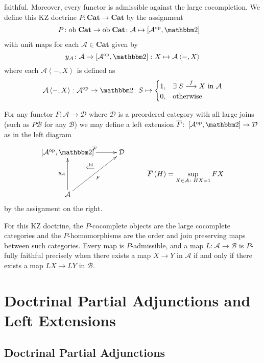 \documentclass[a4paper,oneside,english]{amsart}
\numberwithin{equation}{section}
\numberwithin{figure}{section}
\theoremstyle{plain}
\theoremstyle{definition}
\theoremstyle{remark}
\theoremstyle{definition}
\theoremstyle{plain}
\theoremstyle{plain}
\theoremstyle{plain}
\begin{document}
faithful. Moreover, every functor is admissible against the large
cocompletion. We define this KZ doctrine $P\colon\mathbf{Cat}\to\mathbf{Cat}$
by the assignment 
\[
\begin{aligned}P\colon\textnormal{ob}\;\mathbf{Cat}\to\textnormal{ob}\;\mathbf{Cat}\colon & \mathcal{A}\mapsto\left[\mathcal{A}^{\textnormal{op}},\mathbbm2\right]\end{aligned}
\]
with unit maps for each $\mathcal{A}\in\mathbf{Cat}$ given by
\[
y_{\mathcal{A}}\colon\mathcal{A}\to\left[\mathcal{A}^{\textnormal{op}},\mathbbm2\right]\colon X\mapsto\mathcal{A}\left\langle -,X\right\rangle 
\]
where each $\mathcal{A}\left\langle -,X\right\rangle $ is defined
as 
\[
\mathcal{A}\left\langle -,X\right\rangle \colon\mathcal{A}^{\textnormal{op}}\to\mathbbm2\colon S\mapsto\begin{cases}
1, & \exists\;S\overset{f}{\longrightarrow}X\textnormal{ in }\mathcal{A}\\
0, & \textnormal{otherwise}
\end{cases}
\]

For any functor $F\colon\mathcal{A}\to\mathcal{D}$ where $\mathcal{D}$
is a preordered category with all large joins (such as $P\mathcal{B}$
for any $\mathcal{B}$) we may define a left extension $\overline{F}\colon\left[\mathcal{A}^{\textnormal{op}},\mathbbm2\right]\to\mathcal{D}$
as in the left diagram
\[
\xymatrix@=1em{\left[\mathcal{A}^{\textnormal{op}},\mathbbm2\right]\ar[rr]^{\overline{F}} &  & \mathcal{D}\\
 & \;\ar@{}[ul]|-{\overset{\textnormal{id}}{\Longleftarrow\;}} &  &  & {\displaystyle \overline{F}\left(H\right)=\sup_{X\in\mathcal{A}\colon HX=1}FX}\\
\mathcal{A}\ar[uu]^{y_{\mathcal{A}}}\ar[rruu]_{F}
}
\]
by the assignment on the right.

For this KZ doctrine, the $P$-cocomplete objects are the large cocomplete
categories and the $P$-homomorphisms are the order and join preserving
maps between such categories. Every map is $P$-admissible, and a
map $L\colon\mathcal{A}\to\mathcal{B}$ is $P$-fully faithful precisely
when there exists a map $X\to Y$ in $\mathcal{A}$ if and only if
there exists a map $LX\to LY$ in $\mathcal{B}$.

\section{Doctrinal Partial Adjunctions and Left Extensions}

\subsection{Doctrinal Partial Adjunctions\label{doctrinalpartialadjunctions}}
\end{document}
